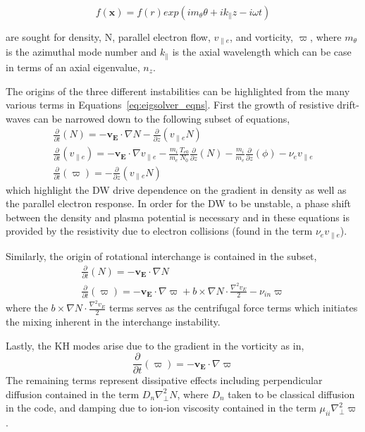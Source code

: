 \documentclass[aip,pop,amsmath,amssymb,reprint,superscriptaddress]{revtex4-1} %
\begin{document}
\begin{equation}
f(\textbf{x}) = f(r)exp(im_{\theta}\theta+ik_{\parallel}z-i\omega t)
\label{eq:eigenmode_func}
\end{equation}

are sought for density, N, parallel electron flow, $v_{\parallel e}$, and vorticity, $\varpi$, where $m_{\theta}$ is the azimuthal mode number and $k_{\parallel}$ is the axial wavelength which can be case in terms of an axial eigenvalue, $n_{z}$.

The origins of the three different instabilities can be highlighted from the many various terms in Equations~\ref{eq:eigsolver_eqns}. First the growth of resistive drift-waves can be narrowed down to the following subset of equations, 
%
\begin{gather}
\frac{\partial}{\partial t}(N) = -\textbf{v}_{\textbf{E}} \cdot \nabla N - \frac{\partial}{\partial z}(v_{\parallel e}N)\\
\frac{\partial}{\partial t}(v_{\parallel e}) = -\textbf{v}_{\textbf{E}} \cdot \nabla v_{\parallel e} - \frac{m_{i}}{m_{e}} \frac{T_{e0}}{N_{0}}\frac{\partial}{\partial z}(N)-\frac{m_i}{m_e} \frac{\partial}{\partial z}(\phi) -\nu_{e}v_{\parallel e}\\
\frac{\partial}{\partial t}(\varpi) = - \frac{\partial}{\partial z}(v_{\parallel e}N)
\label{eq:eigsolver_DWeqns}
\end{gather}
%
which highlight the DW drive dependence on the gradient in density as well as the parallel electron response. In order for the DW to be unstable, a phase shift between the density and plasma potential is necessary and in these equations is provided by the resistivity due to electron collisions (found in the term $\nu_{e}v_{\parallel e}$).

Similarly, the origin of rotational interchange is contained in the subset,
%
\begin{gather}
\frac{\partial}{\partial t}(N) = -\textbf{v}_{\textbf{E}} \cdot \nabla N\\
\frac{\partial}{\partial t}(\varpi) = -\textbf{v}_{\textbf{E}} \cdot \nabla\varpi + b\times \nabla N \cdot \frac{\nabla^{2}v_{E}}{2} - \nu_{in}\varpi
\label{eq:eigsolver_RIeqns}
\end{gather}
%
where the $b\times \nabla N \cdot \frac{\nabla^{2}v_{E}}{2}$ terms serves as the centrifugal force terms which initiates the mixing inherent in the interchange instability.

Lastly, the KH modes arise due to the gradient in the vorticity as in,
%
\begin{equation}
\frac{\partial}{\partial t}(\varpi) = -\textbf{v}_{\textbf{E}} \cdot \nabla\varpi
\label{eq:eigsolver_KHeqn}
\end{equation}
%
The remaining terms represent dissipative effects including perpendicular diffusion contained in the term $D_{n}\nabla^{2}_{\perp}N$, where $D_{n}$ taken to be classical diffusion in the code, and damping due to ion-ion viscosity contained in the term $\mu_{ii}\nabla^{2}_{\perp}\varpi$.
\end{document}
